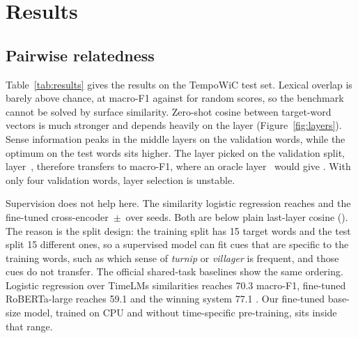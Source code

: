 \documentclass{article}
\newif\iffirstsectiondone
\let\originalsection\section
\renewcommand{\section}{%
  \iffirstsectiondone\Needspace*{0.12\textheight}\else\firstsectiondonetrue\fi
  \originalsection}
\begin{document}
\begin{table}[t]\centering\small
\caption{Training and scoring settings.}
\label{tab:hyper}

\end{table}

\section{Results}

\subsection{Pairwise relatedness}
\label{sec:pairwise}

Table~\ref{tab:results} gives the results on the TempoWiC test set. Lexical
overlap is barely above chance, at \jaccardF{} macro-F1 against \randomF{} for
random scores, so the benchmark cannot be solved by surface similarity.
Zero-shot cosine between target-word vectors is much stronger and depends
heavily on the layer (Figure~\ref{fig:layers}). Sense information peaks in the
middle layers on the validation words, while the optimum on the test words sits
higher. The layer picked on the validation split, layer~\bestLayer{}, therefore
transfers to \zsF{} macro-F1, where an oracle layer~\zsOracleLayer{} would give
\zsOracleF{}. With only four validation words, layer selection is unstable.

Supervision does not help here. The similarity logistic regression reaches
\simlrF{} and the fine-tuned cross-encoder \ftF{}\,$\pm$\,\ftFsd{} over
\numSeeds{} seeds. Both are below plain last-layer cosine (\lastLayerF{}). The
reason is the split design: the training split has 15 target words and the test
split 15 different ones, so a supervised model can fit cues that are specific to
the training words, such as which sense of \textit{turnip} or \textit{villager}
is frequent, and those cues do not transfer. The official shared-task baselines
show the same ordering. Logistic regression over TimeLMs similarities reaches
70.3 macro-F1, fine-tuned RoBERTa-large reaches 59.1 and the winning system 77.1
\citep{lyu2022mllabs}. Our fine-tuned base-size model, trained on CPU and
without time-specific pre-training, sits inside that range.

\begin{table}[t]\centering\footnotesize
\caption{TempoWiC test results (\%). Thresholds for the unsupervised scores are
tuned on the validation split.}
\label{tab:results}

\end{table}
\end{document}
